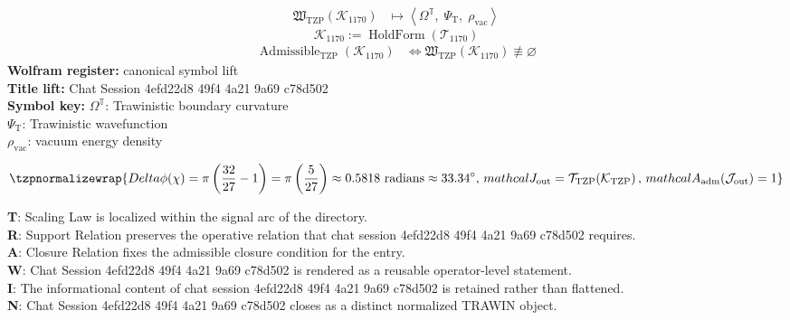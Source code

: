 \noindent
\begin{minipage}[t]{0.48\linewidth}
\begingroup
\small
\[
\begin{aligned}
\mathfrak{W}_{\mathrm{TZP}}\!\left(\mathcal{K}_{1170}\right)
&\longmapsto
\left\langle \Omega^{\mathbb{T}},\; \Psi_{\mathrm{T}},\; \rho_{\mathrm{vac}} \right\rangle
\end{aligned}
\]
\[
\mathcal{K}_{1170}
:=
\operatorname{HoldForm}\!\left(\mathcal{T}_{1170}\right)
\]
\[
\begin{aligned}
\operatorname{Admissible}_{\mathrm{TZP}}\!\left(\mathcal{K}_{1170}\right)
&\Longleftrightarrow
\mathfrak{W}_{\mathrm{TZP}}\!\left(\mathcal{K}_{1170}\right)\not\equiv\varnothing
\end{aligned}
\]
\textbf{Wolfram register:} canonical symbol lift\\
\textbf{Title lift:} Chat Session 4efd22d8 49f4 4a21 9a69 c78d502\\
\textbf{Symbol key:} \(\Omega^{\mathbb{T}}\): Trawinistic boundary curvature\\ \(\Psi_{\mathrm{T}}\): Trawinistic wavefunction\\ \(\rho_{\mathrm{vac}}\): vacuum energy density
\par
\endgroup
\end{minipage}\hfill
\begin{minipage}[t]{0.48\linewidth}
\[
\tzpnormalizewrap{Delta\phi(\chi) = \pi\left(\frac{32}{27} - 1\right) = \pi\left(\frac{5}{27}\right) \approx 0.5818 \text{ radians} \approx 33.34^\circ,\,mathcal{J}_{\mathrm{out}} = \mathcal{T}_{\mathrm{TZP}}\!\left(\mathcal{K}_{\mathrm{TZP}}\right),\,mathcal{A}_{\mathrm{adm}}\!\left(\mathcal{J}_{\mathrm{out}}\right)=1}
\]

\small
\textbf{T}: Scaling Law is localized within the signal arc of the directory.\\
\textbf{R}: Support Relation preserves the operative relation that chat session 4efd22d8 49f4 4a21 9a69 c78d502 requires.\\
\textbf{A}: Closure Relation fixes the admissible closure condition for the entry.\\
\textbf{W}: Chat Session 4efd22d8 49f4 4a21 9a69 c78d502 is rendered as a reusable operator-level statement.\\
\textbf{I}: The informational content of chat session 4efd22d8 49f4 4a21 9a69 c78d502 is retained rather than flattened.\\
\textbf{N}: Chat Session 4efd22d8 49f4 4a21 9a69 c78d502 closes as a distinct normalized TRAWIN object.
\normalsize
\end{minipage}

